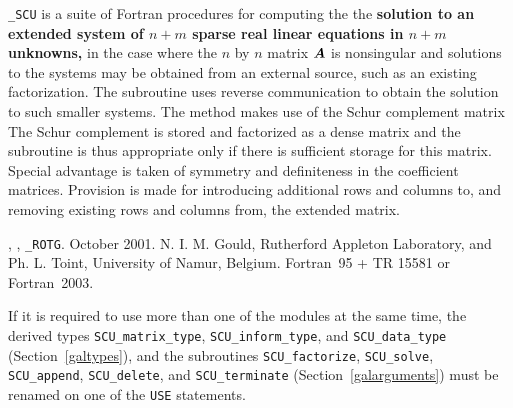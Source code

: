 \documentclass{galahad}
\newcommand{\packagename}{SCU}
\newcommand{\fullpackagename}{\libraryname\-\_\-\packagename}
\begin{document}
\galheader


\galsummary

{\tt \fullpackagename} is a suite of Fortran procedures for 
computing the 
the {\bf solution to an extended system of $n + m$ 
sparse real linear equations in $n  +  m$ unknowns,} 
in the case where the $n$ by $n$ matrix ${\bm{A}}$ is nonsingular 
and solutions to the systems 
may be obtained from an external source, such as an existing 
factorization.  The subroutine uses reverse communication to obtain 
the solution to such smaller systems.  The method makes use of 
the Schur complement matrix 
The Schur complement is stored and factorized as a dense matrix 
and the subroutine is thus appropriate only if there is 
sufficient storage for this matrix. Special advantage is taken 
of symmetry and definiteness in the coefficient matrices. 
Provision is made for introducing additional rows and columns 
to, and removing existing rows and columns from, the extended 
matrix. 
 

\galattributes
\galversions{\tt  \fullpackagename\_single, \fullpackagename\_double},
, {\tt \_ROTG}. 
\galdate October 2001.
\galorigin N. I. M. Gould, Rutherford Appleton Laboratory, and
Ph. L. Toint, University of Namur, Belgium.
\gallanguage Fortran~95 + TR 15581 or Fortran~2003. 


\galhowto



\noindent
If it is required to use more than one of the modules at the same time, 
the derived types
{\tt \packagename\_matrix\_type}, 
{\tt \packagename\_inform\_type}, and
{\tt \packagename\_data\_type} 
(Section~\ref{galtypes}),
and the subroutines
{\tt \packagename\_factorize},  
{\tt \packagename\_solve},  
{\tt \packagename\_append},  
{\tt \packagename\_delete}, 
and 
{\tt \packagename\_terminate} 
(Section~\ref{galarguments})
must be renamed on one of the {\tt USE} statements.
\end{document}
